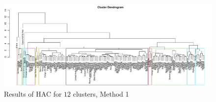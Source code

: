 \documentclass[a4paper,12pt]{article}
\numberwithin{equation}{section}
\begin{document}
\newpage 
\FloatBarrier
\begin{figure}
\includegraphics[width=\textwidth]{plots/dendrogram_12}
\caption{Results of HAC for $12$ clusters, Method 1}\label{fig:dend}
\end{figure}
\end{document}
